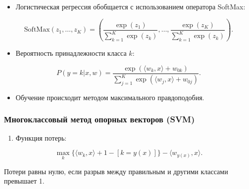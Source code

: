 \begin{itemize}
\tightlist
\item
  Логистическая регрессия обобщается с использованием оператора
  SoftMax:
\end{itemize}

\begin{equation}
\text{SoftMax}(z_1, \ldots, z_K) = \left( \frac{\exp(z_1)}{\sum_{k=1}^K \exp(z_k)}, \ldots, \frac{\exp(z_K)}{\sum_{k=1}^K \exp(z_k)} \right).
\end{equation}

\begin{itemize}
\tightlist
\item
  Вероятность принадлежности класса \(k\):
\end{itemize}

\begin{equation}
P(y = k | x, w) = \frac{\exp(\langle w_k, x \rangle + w_{0k})}{\sum_{j=1}^K \exp(\langle w_j, x \rangle + w_{0j})}.
\end{equation}

\begin{itemize}
\tightlist
\item
  Обучение происходит методом максимального правдоподобия.
\end{itemize}

\hypertarget{ux43cux43dux43eux433ux43eux43aux43bux430ux441ux441ux43eux432ux44bux439-ux43cux435ux442ux43eux434-ux43eux43fux43eux440ux43dux44bux445-ux432ux435ux43aux442ux43eux440ux43eux432-svm}{%
\subsubsection*{Многоклассовый метод опорных векторов
(SVM)}\label{ux43cux43dux43eux433ux43eux43aux43bux430ux441ux441ux43eux432ux44bux439-ux43cux435ux442ux43eux434-ux43eux43fux43eux440ux43dux44bux445-ux432ux435ux43aux442ux43eux440ux43eux432-svm}}

\begin{enumerate}
\def\labelenumi{\arabic{enumi}.}
\tightlist
\item
  Функция потерь:
\end{enumerate}

\begin{equation}
\max_k \{ \langle w_k, x \rangle + 1 - [k = y(x)] \} - \langle w_{y(x)}, x \rangle.
\end{equation}

Потери равны нулю, если разрыв между правильным и другими классами
превышает 1.

